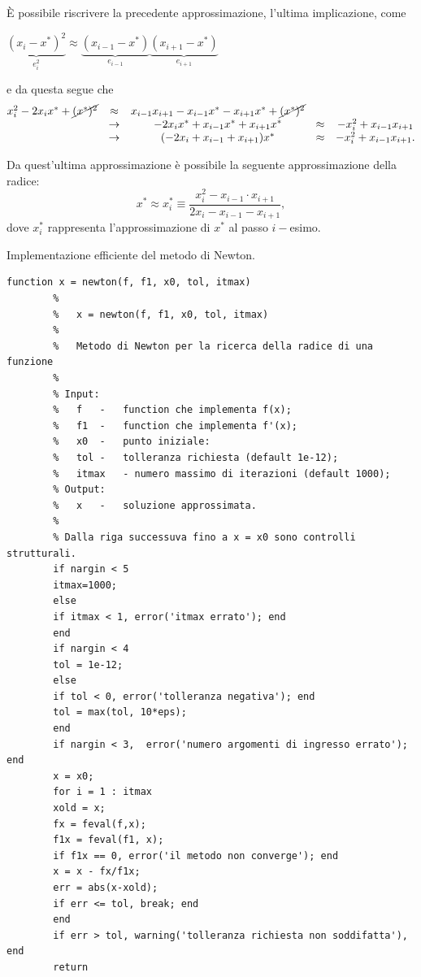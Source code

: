 È possibile riscrivere la precedente approssimazione, l'ultima implicazione, come
\begin{center}
	$\underbrace{(x_i-x^*)^2}_{\text{$e_i^2$}}\approx\underbrace{(x_{i-1}-x^*)}_{\text{$e_{i-1}$}}\underbrace{(x_{i+1}-x^*)}_{\text{$e_{i+1}$}}$ 
\end{center}
e da questa segue che
\begin{equation*}
	\begin{matrix}
		x_i^2-2x_i x^*+\cancel{(x^*)^2}&\approx& x_{i-1} x_{i+1}-x_{i-1} x^* - x_{i+1} x^*+\cancel{(x^*)^2}\\
		&\rightarrow&-2x_i x^*+x_{i-1} x^*+x_{i+1}x^*&\approx&-x_i^2+x_{i-1} x_{i+1}\\
		&\rightarrow&(-2x_i+x_{i-1}+x_{i+1})x^* &\approx& -x_i^2+x_{i-1} x_{i+1}.
	\end{matrix}
\end{equation*}

Da quest'ultima approssimazione è possibile la seguente approssimazione della radice:
\begin{equation}\label{eq:approxAitken}
	x^*\approx x_i^*\equiv\frac{x_i^2-x_{i-1}\cdot x_{i+1}}{2x_i-x_{i-1}-x_{i+1}},
\end{equation}
dove $x_i^*$ rappresenta l'approssimazione di $x^*$ al passo $i-$esimo.

\begin{algorithm}
	\caption{Implementazione efficiente del metodo di Newton.}\label{alg:polNewt}
	\begin{lstlisting}[style=Matlab-editor]
		function x = newton(f, f1, x0, tol, itmax)
		%   
		%   x = newton(f, f1, x0, tol, itmax)
		%
		%   Metodo di Newton per la ricerca della radice di una funzione
		%
		% Input:
		%   f   -   function che implementa f(x);
		%   f1  -   function che implementa f'(x);
		%   x0  -   punto iniziale:
		%   tol -   tolleranza richiesta (default 1e-12);
		%   itmax   - numero massimo di iterazioni (default 1000);
		% Output:
		%   x   -   soluzione approssimata.
		%
		% Dalla riga successuva fino a x = x0 sono controlli strutturali.
		if nargin < 5
		itmax=1000;
		else
		if itmax < 1, error('itmax errato'); end
		end
		if nargin < 4 
		tol = 1e-12;
		else
		if tol < 0, error('tolleranza negativa'); end
		tol = max(tol, 10*eps);
		end
		if nargin < 3,  error('numero argomenti di ingresso errato'); end
		x = x0;
		for i = 1 : itmax
		xold = x;
		fx = feval(f,x);
		f1x = feval(f1, x);
		if f1x == 0, error('il metodo non converge'); end
		x = x - fx/f1x;
		err = abs(x-xold);
		if err <= tol, break; end
		end
		if err > tol, warning('tolleranza richiesta non soddifatta'), end
		return
	\end{lstlisting}
\end{algorithm}


